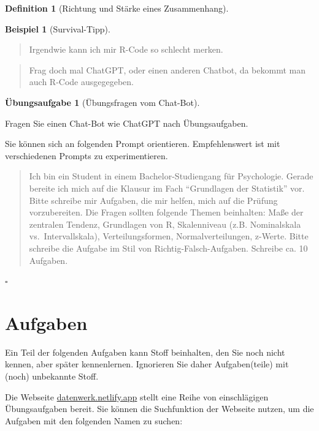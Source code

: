 \documentclass[
  a4paper,
  DIV=11]{scrreprt}
\theoremstyle{definition}
\newtheorem{exercise}{Übungsaufgabe}[chapter]
\theoremstyle{definition}
\newtheorem{example}{Beispiel}[chapter]
\theoremstyle{definition}
\newtheorem{definition}{Definition}[chapter]
\theoremstyle{remark}
\begin{document}
\begin{definition}[Richtung und Stärke eines
Zusammenhang]
\begin{example}[Survival-Tipp]
\end{example}

\begin{quote}
{} Irgendwie kann ich mir R-Code so schlecht merken.
\end{quote}

\begin{quote}
{} Frag doch mal ChatGPT, oder einen anderen Chatbot, da
bekommt man auch R-Code ausgegegeben.
\end{quote}

\begin{exercise}[Übungsfragen vom
Chat-Bot]\protect\hypertarget{exr-chatgpt}{}\label{exr-chatgpt}

Fragen Sie einen Chat-Bot wie ChatGPT nach Übungsaufgaben.

Sie können sich an folgenden Prompt orientieren. Empfehlenswert ist mit
verschiedenen Prompts zu experimentieren.

\begin{quote}
{} Ich bin ein Student in einem Bachelor-Studiengang für
Psychologie. Gerade bereite ich mich auf die Klausur im Fach
``Grundlagen der Statistik'' vor. Bitte schreibe mir Aufgaben, die mir
helfen, mich auf die Prüfung vorzubereiten. Die Fragen sollten folgende
Themen beinhalten: Maße der zentralen Tendenz, Grundlagen von R,
Skalenniveau (z.B. Nominalskala vs.~Intervallskala), Verteilungsformen,
Normalverteilungen, z-Werte. Bitte schreibe die Aufgabe im Stil von
Richtig-Falsch-Aufgaben. Schreibe ca. 10 Aufgaben.
\end{quote}

\(\square\)

\end{exercise}

\section{Aufgaben}\label{aufgaben-4}

Ein Teil der folgenden Aufgaben kann Stoff beinhalten, den Sie noch
nicht kennen, aber später kennenlernen. Ignorieren Sie daher
Aufgaben(teile) mit (noch) unbekannte Stoff.

Die Webseite \href{https://datenwerk.netlify.app}{datenwerk.netlify.app}
stellt eine Reihe von einschlägigen Übungsaufgaben bereit. Sie können
die Suchfunktion der Webseite nutzen, um die Aufgaben mit den folgenden
Namen zu suchen:


\end{definition}
\end{document}
